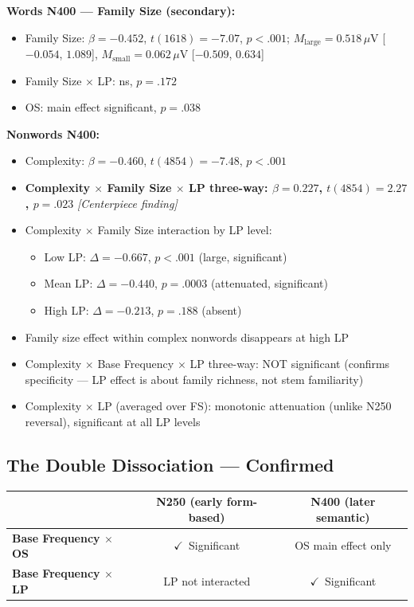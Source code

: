 \documentclass[11pt, a4paper]{article}
\newcommand{\done}{$\checkmark$}
\begin{document}
\textbf{Words N400 — Family Size (secondary):}
\begin{itemize}[leftmargin=1.5em]
  \item Family Size: $\beta = -0.452$, $t(1618) = -7.07$, $p < .001$;
        $M_\text{large} = 0.518\,\mu$V [$-0.054$, $1.089$], $M_\text{small} = 0.062\,\mu$V [$-0.509$, $0.634$]
  \item Family Size $\times$ LP: ns, $p = .172$
  \item OS: main effect significant, $p = .038$
\end{itemize}

\textbf{Nonwords N400:}
\begin{itemize}[leftmargin=1.5em]
  \item Complexity: $\beta = -0.460$, $t(4854) = -7.48$, $p < .001$
  \item \textbf{Complexity $\times$ Family Size $\times$ LP three-way: $\beta = 0.227$, $t(4854) = 2.27$, $p = .023$} \textit{[Centerpiece finding]}
  \item Complexity $\times$ Family Size interaction by LP level:
  \begin{itemize}
    \item Low LP: $\Delta = -0.667$, $p < .001$ (large, significant)
    \item Mean LP: $\Delta = -0.440$, $p = .0003$ (attenuated, significant)
    \item High LP: $\Delta = -0.213$, $p = .188$ (absent)
  \end{itemize}
  \item Family size effect within complex nonwords disappears at high LP
  \item Complexity $\times$ Base Frequency $\times$ LP three-way: NOT significant (confirms specificity — LP effect is about family richness, not stem familiarity)
  \item Complexity $\times$ LP (averaged over FS): monotonic attenuation (unlike N250 reversal), significant at all LP levels
\end{itemize}

\subsection{The Double Dissociation — Confirmed}

\begin{center}
\begin{tabular}{lcc}
  \toprule
   & \textbf{N250 (early form-based)} & \textbf{N400 (later semantic)} \\
  \midrule
  \textbf{Base Frequency $\times$ OS} & \done\ Significant & OS main effect only \\
  \textbf{Base Frequency $\times$ LP} & LP not interacted  & \done\ Significant \\
  \bottomrule
\end{tabular}
\end{center}
\end{document}
